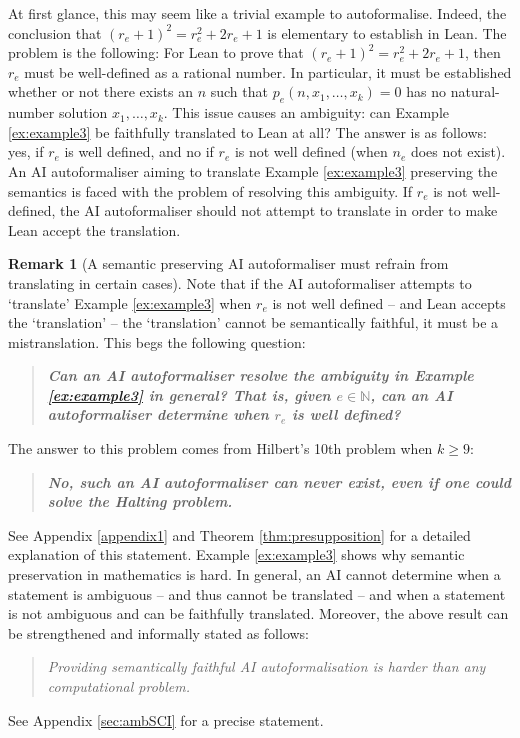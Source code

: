 \documentclass[10pt, a4paper, reqno]{amsart}
\numberwithin{equation}{section}
\renewcommand{\geq}{\geqslant}
\theoremstyle{definition}
\newtheorem{remark}[theorem]{Remark}
\theoremstyle{definition}
\begin{document}
At first glance, this may seem like a trivial example to autoformalise. Indeed, the conclusion that $(r_e+1)^2 = r_e^2 + 2r_e+1$ is elementary to establish in Lean. The problem is the following: For Lean to prove that $(r_e+1)^2 = r_e^2 + 2r_e+1$, then $r_e$ must be well-defined as a rational number. In particular, it must be established whether or not there exists an $n$ such that $p_e(n,x_1,\ldots,x_k)=0$ has no natural-number solution $x_1, \ldots, x_k$. This issue causes an ambiguity: can Example \ref{ex:example3} be faithfully translated to Lean at all? The answer is as follows: yes, if $r_e$ is well defined, and no if $r_e$ is not well defined (when $n_e$ does not exist).  An AI autoformaliser aiming to translate Example \ref{ex:example3} preserving the semantics is faced with the problem of resolving this ambiguity. If $r_e$ is not well-defined, the AI autoformaliser should not attempt to translate in order to make Lean accept the translation. 

\begin{remark}[A semantic preserving AI autoformaliser must refrain from translating in certain cases]\label{rem:remark_refrain}
 Note that if the AI autoformaliser attempts to `translate' Example \ref{ex:example3} when $r_e$ is not well defined -- and Lean accepts the `translation' -- the `translation' cannot be semantically faithful, it must be a mistranslation. 
 This begs the following question: 
\begin{quote}
	{\bf \emph{
		Can an AI autoformaliser resolve the ambiguity in Example \ref{ex:example3} in general? That is, given $e \in \mathbb{N}$, can an AI autoformaliser determine when $r_e$ is well defined? 
	}}
\end{quote}
The answer to this problem comes from Hilbert's 10th problem \cite{Matiyasevich1993} when $k \geq 9$:
\begin{quote}
	{\bf \emph{
		No, such an AI autoformaliser can never exist, even if one could solve the Halting problem. 
	}}
\end{quote}
See Appendix \ref{appendix1} and Theorem \ref{thm:presupposition} for a detailed explanation of this statement. Example \ref{ex:example3} shows why semantic preservation in mathematics is hard. In general, an AI cannot determine when a statement is ambiguous -- and thus cannot be translated -- and when a statement is not ambiguous and can be faithfully translated. Moreover, the above result can be strengthened and informally stated as follows:
 \begin{quote}
	\emph{
		Providing semantically faithful AI autoformalisation is harder than any computational problem. 
	}
\end{quote}
See Appendix \ref{sec:ambSCI} for a precise statement.
\end{remark}
\end{document}
